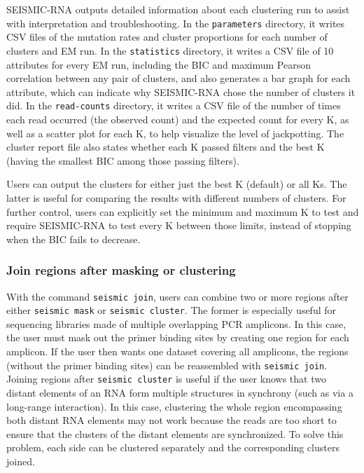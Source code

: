 \documentclass[11pt]{article}
\begin{document}
SEISMIC-RNA outputs detailed information about each clustering run to assist with interpretation and troubleshooting.
In the \verb|parameters| directory, it writes CSV files of the mutation rates and cluster proportions for each number of clusters and EM run.
In the \verb|statistics| directory, it writes a CSV file of 10 attributes for every EM run, including the BIC and maximum Pearson correlation between any pair of clusters, and also generates a bar graph for each attribute, which can indicate why SEISMIC-RNA chose the number of clusters it did.
In the \verb|read-counts| directory, it writes a CSV file of the number of times each read occurred (the observed count) and the expected count for every K, as well as a scatter  plot for each K, to help visualize the level of jackpotting.
The cluster report file also states whether each K passed filters and the best K (having the smallest BIC among those passing filters).

Users can output the clusters for either just the best K (default) or all Ks.
The latter is useful for comparing the results with different numbers of clusters.
For further control, users can explicitly set the minimum and maximum K to test and require SEISMIC-RNA to test every K between those limits, instead of stopping when the BIC fails to decrease.

\subsubsection{Join regions after masking or clustering}
\label{seismic-join}

With the command \verb|seismic join|, users can combine two or more regions after either \verb|seismic mask| or \verb|seismic cluster|.
The former is especially useful for sequencing libraries made of multiple overlapping PCR amplicons.
In this case, the user must mask out the primer binding sites by creating one region for each amplicon.
If the user then wants one dataset covering all amplicons, the regions (without the primer binding sites) can be reassembled with \verb|seismic join|.
Joining regions after \verb|seismic cluster| is useful if the user knows that two distant elements of an RNA form multiple structures in synchrony (such as via a long-range interaction).
In this case, clustering the whole region encompassing both distant RNA elements may not work because the reads are too short to ensure that the clusters of the distant elements are synchronized.
To solve this problem, each side can be clustered separately and the corresponding clusters joined.
\end{document}
